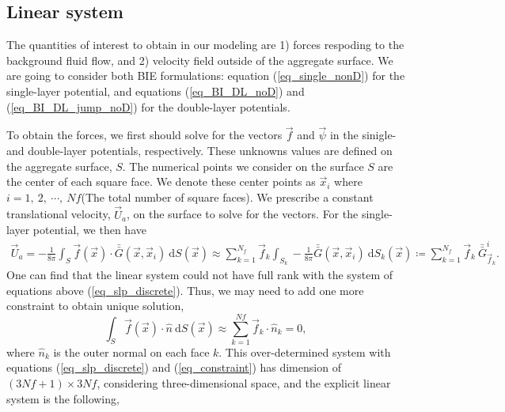 \subsection{Linear system}
 The quantities of interest to obtain in our modeling are 1) forces respoding to the background fluid flow, and 2) velocity field outside of the aggregate surface. 
 We are going to consider both BIE formulations: equation (\ref{eq_single_nonD}) for the single-layer potential, and equations (\ref{eq_BI_DL_noD}) and (\ref{eq_BI_DL_jump_noD}) for the double-layer potentials. 
 \par
 To obtain the forces, we first should solve for the vectors $\vec{f}$ and $\vec{\psi}$ in the sinigle- and double-layer potentials, respectively. These unknowns values are defined on the aggregate surface, $S$. The numerical points we consider on the surface $S$ are the center of each square face. We denote these center points as $\vec{x}_i$ where $i = 1, \ 2,\ \cdots, \ Nf$(The total number of square faces). We prescribe a constant translational velocity, $\vec{U}_a$, on the surface to solve for the vectors. For the single-layer potential, we then have
\begin{align}
	\vec{U}_a = - \frac{1}{8 \pi } \int_S  \vec{f}(\vec{x}) \cdot \bar{\bar{G}}(\vec{x},\vec{x}_i) \ \text{d}S(\vec{x}) 
	\approx \sum_{k=1}^{N_f}  \vec{f}_k  \int_{S_{k}}  - \frac{1}{8 \pi } \bar{\bar{G}}(\vec{x},\vec{x}_i) \ \text{d}S_k(\vec{x})
	\coloneqq \sum_{k=1}^{N_f} \vec{f}_k \ \bar{\bar{G}}_{\vec{f}_k}^i. 
	\label{eq_slp_discrete}
\end{align}
One can find that the linear system could not have full rank with the system of equations above (\ref{eq_slp_discrete}). Thus, we may need to add one more constraint to obtain unique solution,
\begin{equation}
	\int_S \vec{f}(\vec{x}) \cdot \hat{n}  \ \textrm{d}S (\vec{x})
	\approx \sum_{k=1}^{Nf} \vec{f}_k \cdot \hat{n}_k 
	= 0,
	\label{eq_constraint}
\end{equation}
where $\hat{n}_k$ is the outer normal on each face $k$. This over-determined system with equations (\ref{eq_slp_discrete}) and (\ref{eq_constraint}) has dimension of $(3Nf + 1) \times 3 Nf$, considering three-dimensional space, and the explicit linear system is the following,

